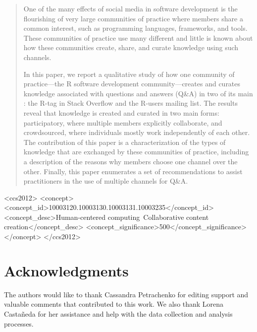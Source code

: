 \documentclass{sig-alternate-05-2015}
\begin{document}
\date{\the\year}

\maketitle

\begin{abstract}
One of the many effects of social media in software development is the flourishing of very large communities of practice where members share a common interest, such as programming languages, frameworks, and tools. These communities of practice use many different \channels and little is known about how these communities create, share, and curate knowledge using such channels.

In this paper, we report a qualitative study of how one community of practice---the R software development community---creates and curates knowledge associated with questions and answers (Q\&A) in two of its main \channels: the R-tag in Stack Overflow and the R-users mailing list. The results reveal that knowledge is created and curated in two main forms: participatory, where multiple members explicitly collaborate, and crowdsourced, where individuals mostly work independently of each other. The contribution of this paper is a characterization of the types of knowledge that are exchanged by these communities of practice, including a description of the reasons why members choose one channel over the other.  Finally, this paper enumerates a set of recommendations to assist practitioners in the use of multiple channels for Q\&A. 

\end{abstract}

%
%
\begin{CCSXML}
<ccs2012>
<concept>
<concept_id>10003120.10003130.10003131.10003235</concept_id>
<concept_desc>Human-centered computing~Collaborative content creation</concept_desc>
<concept_significance>500</concept_significance>
</concept>
</ccs2012>
\end{CCSXML}


%
%

%
%
\printccsdesc

\keywords{\mykeywords}



%





\section{Acknowledgments}
The authors would like to thank Cassandra Petrachenko for editing support and valuable comments that contributed to this work. We also thank Lorena Castañeda for her assistance and help with the data collection and analysis processes.



\end{document}
